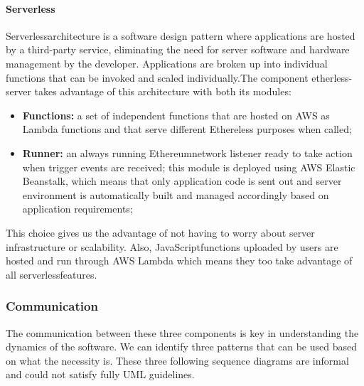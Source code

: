 \paragraph{Serverless}
Serverless\glo architecture is a software design pattern where applications are hosted by a third-party service, eliminating the need for server software and hardware management by the developer. Applications are broken up into individual functions that can be invoked and scaled individually.\newline\newline The component etherless-server takes advantage of this architecture with both its modules:
\begin{itemize}
	\item \textbf{Functions:} a set of independent functions that are hosted on AWS as Lambda functions and that serve different Ethereless purposes when called;
	\item \textbf{Runner:} an always running Ethereum\glo network listener ready to take action when trigger events are received; this module is deployed using AWS Elastic Beanstalk, which means that only application code is sent out and server environment is automatically built and managed accordingly based on application requirements;
\end{itemize}
This choice gives us the advantage of not having to worry about server infrastructure or scalability.
Also, JavaScript\glo functions uploaded by users are hosted and run through AWS Lambda which means they too take advantage of all serverless\glo features.
\newpage
\subsubsection{Communication}
The communication between these three components is key in understanding the dynamics of the software. We can identify three patterns that can be used based on what the necessity is.
These three following sequence diagrams are informal and could not satisfy fully UML guidelines.
